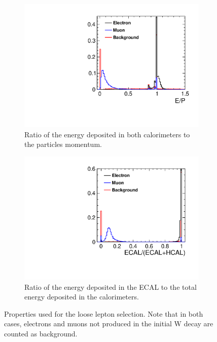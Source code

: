 \begin{figure}
  \centering
  \begin{subfigure}[t]{.5\textwidth}
    \centering
    \includegraphics[width=1\linewidth,keepaspectratio]{HiggsAnalysis/figures/EByP}
    \caption{Ratio of the energy deposited in both calorimeters to the particles momentum.}
  \end{subfigure}%
  \begin{subfigure}[t]{.5\textwidth}
    \centering
    \includegraphics[width=1\linewidth,keepaspectratio]{HiggsAnalysis/figures/ECALByE}
    \caption{Ratio of the energy deposited in the ECAL to the total energy deposited in the calorimeters. }
  \end{subfigure}
  \caption[Parameters used for loose lepton selection]{Properties used for the loose lepton selection.  Note that in both cases, electrons and muons not produced in the initial W decay are counted as background.}
  \label{fig:lepfinding}
\end{figure}

